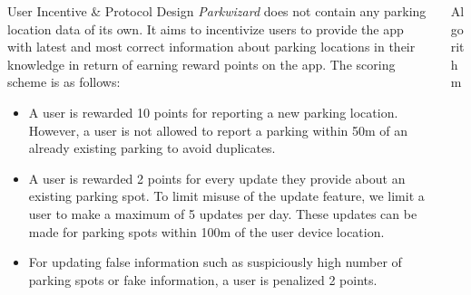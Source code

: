 \documentclass[final]{beamer}
\newlength{\onecolwid}
\newlength{\twocolwid}
\begin{document}
\begin{frame}[t]
\begin{columns}[t]
\begin{column}{\onecolwid}
\begin{block}{User Incentive \& Protocol Design}
\fontsize{34}{40} \selectfont \textit{Parkwizard} does not contain any parking location data of its own. It aims to incentivize users to provide the app with latest and most correct information about parking locations in their knowledge in return of earning reward points on the app. The scoring scheme is as follows:
\begin{itemize}
\fontsize{34}{40} \selectfont \item A user is rewarded 10 points for reporting a new parking location. However, a user is not allowed to report a parking within 50m of an already existing parking to avoid duplicates.

\fontsize{34}{40} \selectfont \item A user is rewarded 2 points for every update they provide about an existing parking spot. To limit misuse of the update feature, we limit a user to make a maximum of 5 updates per day. These updates can be made for parking spots within 100m of the user device location.

\fontsize{34}{40} \selectfont \item For updating false information such as suspiciously high number of parking spots or fake information, a user is penalized 2 points.

\end{itemize}

\end{block}

\end{column} %

\begin{column}{\twocolwid} %

\begin{block}{Algorithm}


\end{block}
\end{column}
\end{columns}
\end{frame}
\end{document}
